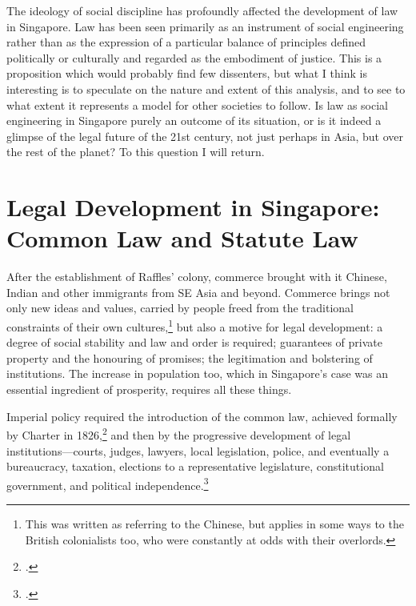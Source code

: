 The ideology of social discipline has profoundly affected the
development of law in Singapore. Law has been seen primarily as
an instrument of social engineering rather than as the expression
of a particular balance of principles defined politically or
culturally and regarded as the embodiment of justice. This is a
proposition which would probably find few dissenters, but what I
think is interesting is to speculate on the nature and extent of
this analysis, and to see to what extent it represents a model
for other societies to follow. Is law as social engineering in
Singapore purely an outcome of its situation, or is it indeed a
glimpse of the legal future of the 21st century, not just perhaps
in Asia, but over the rest of the planet? To this question I will
return.


\section{Legal Development in Singapore: Common Law and Statute Law}

After the establishment of Raffles' colony, commerce brought with
it Chinese, Indian and other immigrants from SE Asia and beyond.
Commerce brings not only new ideas and values, carried by people
freed from the traditional constraints of their own
cultures,\footnote{ This was written as referring to the Chinese,
  but applies in some ways to the British colonialists too, who
  were constantly at odds with their overlords.} but also a
motive for legal development: a degree of social stability and
law and order is required; guarantees of private property and the
honouring of promises; the legitimation and bolstering of
institutions. The increase in population too, which in
Singapore's case was an essential ingredient of prosperity,
requires all these things.

Imperial policy required the introduction of the common law,
achieved formally by Charter in
1826,\footnote{.} and then by the
progressive development of legal institutions---courts, judges,
lawyers, local legislation, police, and eventually a bureaucracy,
taxation, elections to a representative legislature,
constitutional government, and political
independence.\footnote{.}


